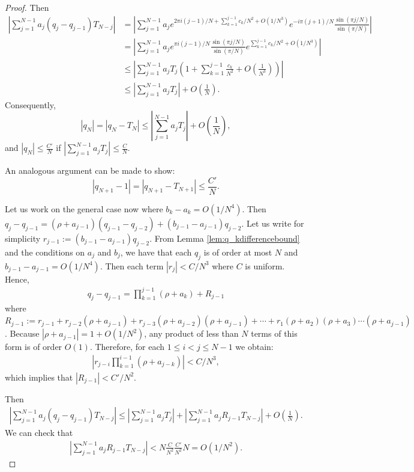 \documentclass{amsart}
\theoremstyle{remark}
\theoremstyle{definition}
\newcommand{\lp}{\left(}
\newcommand{\rp}{\right)}
\begin{document}
\begin{proof}
    Then
    \begin{align*}
        \left|\sum_{j=1}^{N-1} a_j (q_j-q_{j-1})T_{N-j} \right|
        &= \left| \sum_{j=1}^{N-1} a_j e^{2\pi i(j-1)/N + \sum_{k=1}^{j-1}c_k/N^2 + O(1/N^3)} e^{-i\pi(j+1)/N}\frac{\sin(\pi j/N)}{\sin(\pi/N)} \right| \\
        &= \left| \sum_{j=1}^{N-1} a_j e^{\pi i(j-1)/N}\frac{\sin(\pi j/N)}{\sin(\pi/N)} e^{\sum_{k=1}^{j-1}c_k/N^2+O(1/N^3)}\right| \\
        &\leq \left| \sum_{j=1}^{N-1} a_j T_j \lp 1 + \sum_{k=1}^{j-1} \frac{c_k}{N^2} + O\lp\frac{1}{N^3}\rp \rp \right| \\
        &\leq \left|\sum_{j=1}^{N-1}a_j T_j \right| + O\lp\frac{1}{N}\rp.
    \end{align*}
     Consequently, 
     \begin{equation*}
         |q_N| = |q_N-T_N| \leq \left|\sum_{j=1}^{N-1}a_j T_j \right| + O\lp\frac{1}{N}\rp,
     \end{equation*}
    and $|q_N|\leq \frac{C'}{N}$ if $\left|\sum_{j=1}^{N-1}a_j T_j \right| \leq \frac{C}{N}$.

    An analogous argument can be made to show:
    \[
    |q_{N+1}-1|=|q_{N+1}-T_{N+1}|\leq \frac{C'}{N}.\]

Let us work on the general case now where $b_k-a_k=O(1/N^4)$. 
Then $q_j-q_{j-1}=(\rho+a_{j-1})(q_{j-1}-q_{j-2})+(b_{j-1}-a_{j-1})q_{j-2}$. 
Let us write for simplicity $r_{j-1}:=(b_{j-1}-a_{j-1})q_{j-2}$.
From Lemma \ref{lem:q_kdifferencebound} and the conditions on $a_j$ and $b_j$, we have that each $q_j$ is of order at most $N$ and $b_{j-1}-a_{j-1}=O(1/N^4)$. Then each term $|r_j|<C/N^3$ where $C$ is uniform. 
Hence,
\begin{align*}
    q_j-q_{j-1} = \prod_{k=1}^{j-1} (\rho+{a}_{k}) + R_{j-1}
\end{align*}
where $R_{j-1}:= r_{j-1}+r_{j-2}(\rho+a_{j-1})+r_{j-3}(\rho+a_{j-2})(\rho+a_{j-1})+ \cdots+ r_{1}(\rho+a_2)(\rho+a_{3})\cdots (\rho+a_{j-1})$.
Because $|\rho+a_{j-1}|=1+O(1/N^2)$, any product of less than $N$ terms of this form is of order $O(1)$. 
Therefore, for each $1\leq i < j \leq N-1$ we obtain:
\begin{align*}
    |r_{j-i}\prod_{k=1}^{i-1}(\rho+a_{j-k})|<C/N^3,
\end{align*}
which implies that $|R_{j-1}|<C'/N^2$.

Then
    \begin{align*}
        \left|\sum_{j=1}^{N-1} a_j (q_j-q_{j-1})T_{N-j} \right|\leq \left|\sum_{j=1}^{N-1}a_jT_j\right|+\left|\sum_{j=1}^{N-1}a_jR_{j-1}T_{N-j} \right|+O\lp\frac{1}{N}\rp.
\end{align*}
We can check that
\begin{align*}
\left|\sum_{j=1}^{N-1}a_jR_{j-1}T_{N-j} \right| < N\frac{C}{N^2}\frac{C'}{N^2}N = O(1/N^2).
\end{align*}
\end{proof}
\end{document}

